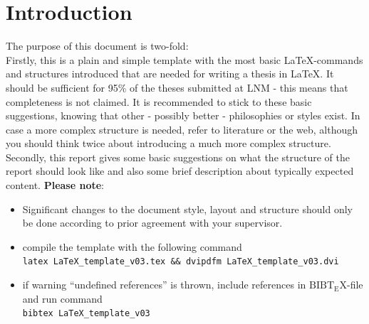 \documentclass[12pt,a4paper]{article}
\makeatletter
\newcommand{\insertblankpage}{\mbox{}\thispagestyle{empty}\addtocounter{page}{-1}\newpage}
\newcommand{\BibTeX}{$\mathrm{B{\scriptstyle{IB}} \! T\!_{\displaystyle E} \! X}$}
\renewcommand{\cleardoublepage}{\clearpage\if@twoside \ifodd\c@page\else
  \hbox{}
  \vspace*{\fill}
  \thispagestyle{empty}
  \newpage
  \if@twocolumn\hbox{}\newpage\fi\fi\fi}
\makeatother
\begin{document}
\cleardoublepage
\insertblankpage


\fancyhead[RO,LE,LO]{\fancyplain{}{}}
\fancyhead[CE]{\fancyplain{}{\leftmark}}
\fancyhead[CO]{\fancyplain{}{\rightmark}}

\section{Introduction}
\label{sec:intro}

The purpose of this document is two-fold:\\
Firstly, this is a plain and simple template with the most basic
\LaTeX-commands and structures introduced that are needed for writing a thesis
in \LaTeX. It should be sufficient for 95\% of the theses submitted at LNM -
this means that completeness is not claimed. It is recommended to stick to
these basic suggestions, knowing that other - possibly better - philosophies
or styles exist. In case a more complex structure is needed, refer to
literature or the web, although you should think twice about introducing a
much more complex structure. \\ 
Secondly, this report gives some basic suggestions on what the structure of
the report should look like and also some brief description about typically
expected content.
\newline
\textbf{Please note}: 
\begin{itemize}
 \item Significant changes to the document style, layout and structure should only be done according to prior agreement with your supervisor.
 \item compile the template with the following command \\
 \verb!latex LaTeX_template_v03.tex && dvipdfm LaTeX_template_v03.dvi!
 \item if warning ``undefined references'' is thrown, include references in \BibTeX-file
   and run command \\
 \verb!bibtex LaTeX_template_v03!
\end{itemize}
\end{document}
